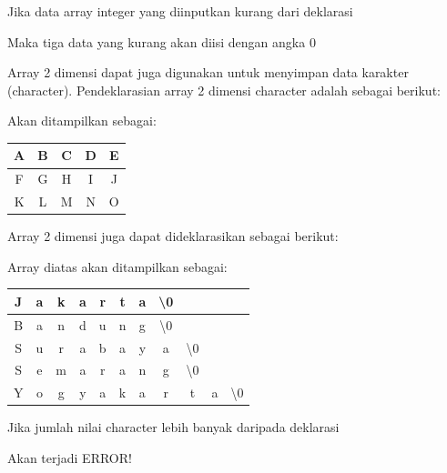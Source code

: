 

Jika data array integer yang diinputkan kurang dari deklarasi



Maka tiga data yang kurang akan diisi dengan angka 0

Array 2 dimensi dapat juga digunakan untuk menyimpan data karakter
(character). Pendeklarasian array 2 dimensi character adalah sebagai
berikut:



Akan ditampilkan sebagai:

\begin{tabular}{|c|c|c|c|c|}
\hline
A &B &C& D& E \\ \hline
F &G &H &I& J \\ \hline
K &L &M& N& O \\ \hline

\end{tabular}

Array 2 dimensi juga dapat dideklarasikan sebagai berikut:



Array diatas akan ditampilkan sebagai:

\begin{tabular}{|c|c|c|c|c|c|c|c|c|c|c|}
\hline
J & a & k & a & r & t & a & \textbackslash{0} & & & \\ \hline
B & a & n & d & u & n & g & \textbackslash{0} & & & \\ \hline
S & u & r & a & b & a & y & a &\textbackslash{0} & &\\ \hline
S & e & m & a & r & a & n & g & \textbackslash{0} & & \\ \hline
Y & o & g & y & a & k & a & r & t & a & \textbackslash{0} \\ \hline

\end{tabular}


Jika jumlah nilai character lebih banyak daripada deklarasi



{\LARGE {}} Akan terjadi ERROR!

\begin{figure}[htbp]
\centering
{}

\end{figure}

